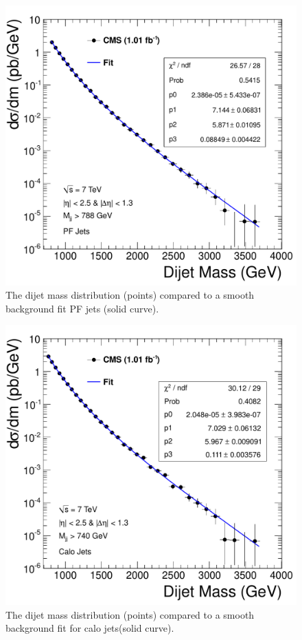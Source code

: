 \begin{figure}[!ht]
  \begin{center}
   \includegraphics[width=\textwidth]{Figures/DijetMass_withFit_pf.pdf}
    \caption{The dijet mass distribution (points) compared to a smooth background fit PF jets (solid
curve). }
    \label{Fit_pf}
  \end{center}
\end{figure}

\begin{figure}[!ht]
  \begin{center}
   \includegraphics[width=\textwidth]{Figures/DijetMass_withFit_calo.pdf}
    \caption{The dijet mass distribution (points) compared to a smooth background fit for calo jets(solid
curve). }
    \label{Fit_calo}
  \end{center}
\end{figure}

